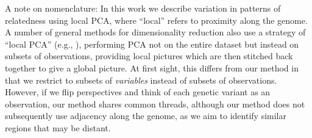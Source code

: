 \documentclass[11pt, oneside]{article}   	%
\newcommand\citep{\cite}
\begin{document}


A note on nomenclature: In this work we describe variation in patterns of relatedness using local PCA,
where ``local'' refers to proximity along the genome.
A number of general methods for dimensionality reduction also use a strategy of ``local PCA''
(e.g., \citep{manjon2013diffusion,kambhatla1997dimension,weingessel2000local,roweis2000nonlinear}),
performing PCA not on the entire dataset but instead on subsets of observations,
providing local pictures which are then stitched back together to give a global picture.
At first sight,
this differs from our method in that we restrict to subsets of \emph{variables} instead of subsets of observations.
However, if we flip perspectives and think of each genetic variant as an observation,
our method shares common threads, although 
our method does not subsequently use adjacency along the genome,
as we aim to identify similar regions that may be distant.
\end{document}
